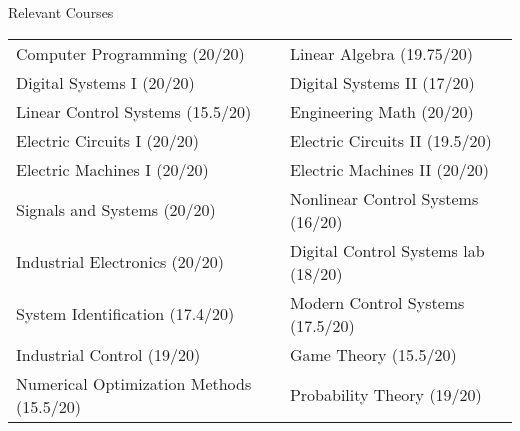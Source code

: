 \begin{rubric}{Relevant Courses}
    \begin{tabular}{p{} | p{} }
        Computer Programming (20/20) & Linear Algebra (19.75/20) \\
        Digital Systems I (20/20) & Digital Systems II (17/20) \\
        Linear Control Systems (15.5/20)& Engineering Math (20/20) \\
        Electric Circuits I (20/20) & Electric Circuits II (19.5/20) \\
        Electric Machines I (20/20) & Electric Machines II (20/20) \\
        Signals and Systems (20/20) & Nonlinear Control Systems (16/20) \\
        Industrial Electronics (20/20) & Digital Control Systems lab (18/20)\\
        System Identification (17.4/20)   & Modern Control Systems (17.5/20) \\
        Industrial Control (19/20) & Game Theory (15.5/20) \\
        Numerical Optimization Methods (15.5/20) & Probability Theory (19/20) \\
    
    \end{tabular}
\end{rubric}
